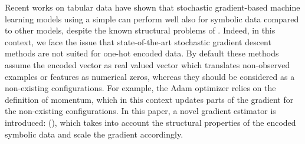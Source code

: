 Recent works on tabular data \cite{RevisitingDeepForTabular} \cite{DeepTabularSurvey} have shown that stochastic gradient-based machine learning models using a simple \ohe can perform well also for symbolic data compared to other models, despite the known structural problems of \ohe. 
Indeed, in this context, we face the issue that state-of-the-art stochastic gradient descent methods are not suited for one-hot encoded data. By default these methods assume the encoded vector as real valued vector which translates non-observed examples or features as numerical zeros, whereas they should be considered as a non-existing configurations. For example, the Adam optimizer \cite{adam} relies on the definition of momentum, which in this context updates parts of the gradient for the non-existing configurations. In this paper, a novel gradient estimator is introduced: \tecname (\tecnameAbrv), which takes into account 
the structural properties of the encoded symbolic data and scale the gradient accordingly. 







